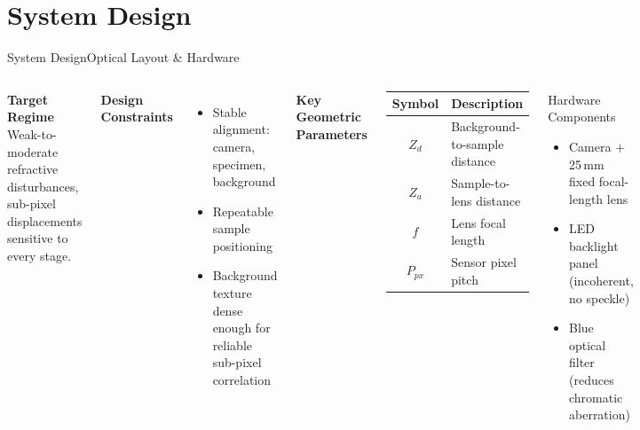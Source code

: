 \documentclass[9pt, aspectratio=169]{beamer}
\newcommand{\theadrow}{\rowcolor{accentlight}}
\begin{document}
\section{System Design}

\begin{frame}{System Design}{Optical Layout \& Hardware}
  \begin{columns}[t]
      \textbf{Target Regime}\\[0.2em]
      Weak-to-moderate refractive disturbances, sub-pixel displacements sensitive to every stage.

      \vspace{0.35em}
      \textbf{Design Constraints}
      \begin{itemize}
        \item Stable alignment: camera, specimen, background
        \item Repeatable sample positioning
        \item Background texture dense enough for reliable sub-pixel correlation
      \end{itemize}
      \vspace{0.35em}
      \textbf{Key Geometric Parameters}
      \begin{center}
        \small
        \begin{tabular}{cl}
          \toprule
          \theadrow Symbol & Description \\
          \midrule
          $Z_d$    & Background-to-sample distance \\
          $Z_a$    & Sample-to-lens distance \\
          $f$      & Lens focal length \\
          $P_{px}$ & Sensor pixel pitch \\
          \bottomrule
        \end{tabular}
      \end{center}
    \vspace{-0.25cm}
      \begin{block}{Hardware Components}
        \begin{itemize}
          \item Camera + 25\,mm fixed focal-length lens
          \item LED backlight panel (incoherent, no speckle)
          \item Blue optical filter (reduces chromatic aberration)

\end{itemize}
\end{block}
\end{columns}
\end{frame}
\end{document}
